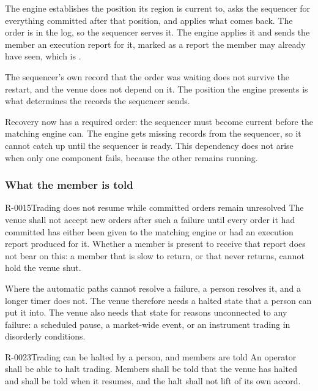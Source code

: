 The engine establishes the position its region is current to, asks the sequencer
for everything committed after that position, and applies what comes back. The
order is in the log, so the sequencer serves it. The engine applies it and sends
the member an execution report for it, marked as a report the member may already
have seen, which is .

The sequencer's own record that the order was waiting does not survive the
restart, and the venue does not depend on it. The position the engine presents is
what determines the records the sequencer sends.

Recovery now has a required order: the sequencer must become current before the
matching engine can. The engine gets missing records from the sequencer, so it
cannot catch up until the sequencer is ready. This dependency does not arise
when only one component fails, because the other remains running.

\subsubsection{What the member is told}
\label{sec:ha:disabled:seq_and_me:member}

\begin{requirement}{R-0015}{Trading does not resume while committed orders remain unresolved}
  The venue shall not accept new orders after such a failure until every order
  it had committed has either been given to the matching engine or had an
  execution report produced for it. Whether a member is present to receive that
  report does not bear on this: a member that is slow to return, or that never
  returns, cannot hold the venue shut.
\end{requirement}

Where the automatic paths cannot resolve a failure, a person resolves it, and a
longer timer does not. The venue therefore needs a halted state that a person can
put it into. The venue also needs that state for reasons unconnected to any
failure: a scheduled pause, a market-wide event, or an instrument trading in
disorderly conditions.

\begin{requirement}{R-0023}{Trading can be halted by a person, and members are told}
  An operator shall be able to halt trading. Members shall be told that the
  venue has halted and shall be told when it resumes, and the halt shall not
  lift of its own accord.
\end{requirement}

